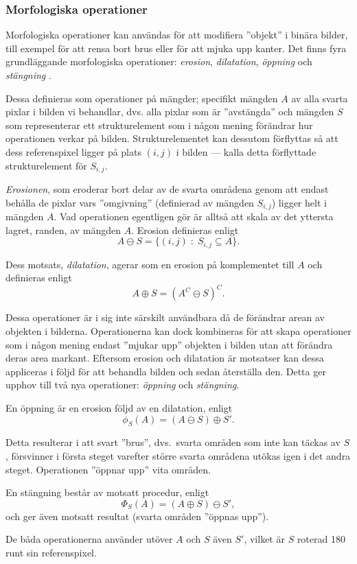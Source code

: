 \documentclass[../rapport_MVEX01-11-05]{subfiles}
\begin{document}
\subsubsection{Morfologiska operationer}

Morfologiska operationer kan användas för att modifiera ''objekt'' i
binära bilder, till exempel för att rensa bort brus eller för att
mjuka upp kanter. Det finns fyra grundläggande morfologiska
operationer: \emph{erosion}, \emph{dilatation}, \emph{öppning} och
\emph{stängning} \cite[ss.~25]{Rudemo09}.

Dessa definieras som operationer på mängder; specifikt mängden $A$
av alla svarta pixlar i bilden vi behandlar, dvs. alla pixlar som är
''avstängda'' och mängden $S$ som representerar ett strukturelement
som i någon mening förändrar hur operationen verkar på bilden.
Strukturelementet kan dessutom förflyttas så att dess referenspixel
ligger på plats $(i,j)$ i bilden --- kalla detta förflyttade
strukturelement för $S_{i,j}$.

\emph{Erosionen}, som eroderar bort delar av de svarta områdena genom
att endast behålla de pixlar vars ''omgivning'' (definierad av mängden
$S_{i,j}$) ligger helt i mängden $A$. Vad operationen egentligen gör är alltså
att skala av det yttersta lagret, randen, av mängden $A$. Erosion definieras enligt
\begin{equation*}
  A\ominus S = \{(i,j)\;:\;S_{i,j}\subseteq A\}.
\end{equation*}

Dess motsats, \emph{dilatation}, agerar som
en erosion på komplementet till $A$ och definieras enligt
\begin{equation*}
  A\oplus S = (A^C\ominus S)^C.
\end{equation*}

Dessa operationer är i sig inte särskilt användbara då de förändrar
arean av objekten i bilderna. Operationerna kan dock kombineras för
att skapa operationer som i någon mening endast 
''mjukar upp'' objekten i bilden utan att förändra deras area markant.
Eftersom erosion och dilatation är motsatser kan dessa appliceras i
följd för att behandla bilden och
sedan återställa den. Detta ger upphov till två nya operationer:
\emph{öppning} och \emph{stängning}.

En öppning är en erosion följd av en dilatation, enligt
\begin{equation*}
  \phi_S(A)=(A\ominus S)\oplus S'.
\end{equation*}

Detta resulterar i att svart ''brus'', dvs.~svarta områden som inte kan täckas av $S$, försvinner i
första steget varefter större svarta områdena utökas igen i det andra
steget. Operationen ''öppnar upp'' vita områden.

En stängning består av motsatt procedur, enligt
\begin{equation*}
  \Phi_S(A)=(A\oplus S)\ominus S',
\end{equation*}
och ger även motsatt resultat (svarta områden ''öppnas upp'').

De
båda operationerna använder utöver $A$ och $S$ även $S'$, vilket är
$S$ roterad 180\textdegree{} runt sin referenspixel.
\end{document}
